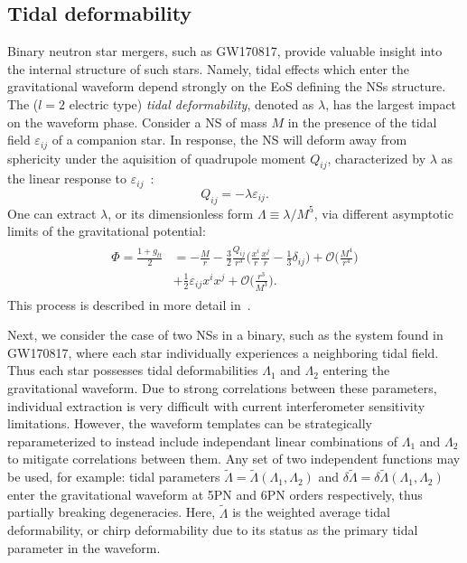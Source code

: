 \documentclass[prd,twocolumn,nofootinbib,superscriptaddress,amsmath,amssymb]{revtex4-1}
\begin{document}
\subsection{Tidal deformability}\label{tidal}
Binary neutron star mergers, such as GW170817, provide valuable insight into the internal structure of such stars. 
Namely, tidal effects which enter the gravitational waveform depend strongly on the EoS defining the NSs structure. 
The ($l=2$ electric type) \emph{tidal deformability}, denoted as $\lambda$, has the largest impact on the waveform phase. 
Consider a NS of mass $M$ in the presence of the tidal field $\varepsilon_{ij}$ of a companion star.
In response, the NS will deform away from sphericity under the aquisition of quadrupole moment $Q_{ij}$, characterized by $\lambda$ as the linear response to $\varepsilon_{ij}$~\cite{Flanagan2008,hinderer-love,Yagi2013}:
\begin{equation}
Q_{ij}=-\lambda \varepsilon_{ij}.
\end{equation}
One can extract $\lambda$, or its dimensionless form $\Lambda \equiv \lambda/M^5$, via different asymptotic limits of the gravitational potential:
\begin{align}
\begin{split}
\Phi=\frac{1+g_{tt}}{2}&=-\frac{M}{r} - \frac{3}{2}\frac{Q_{ij}}{r^3} \Bigg(\frac{x^i}{r} \frac{x^j}{r}-\frac{1}{3}\delta_{ij} \Bigg) + \mathcal{O} \Bigg( \frac{M^4}{r^4} \Bigg)\\
&+ \frac{1}{2} \varepsilon_{ij} x^i x^j + \mathcal{O} \Bigg( \frac{r^3}{M^3} \Bigg).
\end{split}
\end{align}
This process is described in more detail in~\cite{hinderer-love}.

Next, we consider the case of two NSs in a binary, such as the system found in GW170817, where each star 
individually experiences a neighboring tidal field.
Thus each star possesses tidal deformabilities $\Lambda_1$ and $\Lambda_2$ entering the gravitational waveform.
Due to strong correlations between these parameters, individual extraction is very difficult with current interferometer sensitivity limitations.
However, the waveform templates can be strategically reparameterized to instead include independant linear combinations of $\Lambda_1$ and $\Lambda_2$ to mitigate correlations between them. 
Any set of two independent functions may be used, for example: tidal parameters $\tilde{\Lambda}=\tilde{\Lambda}(\Lambda_1,\Lambda_2)$ and $\delta \tilde{\Lambda}=\delta \tilde{\Lambda}(\Lambda_1,\Lambda_2)$ enter the gravitational waveform at 5PN and 6PN orders respectively, thus partially breaking degeneracies.
Here, $\tilde{\Lambda}$ is the weighted average tidal deformability, or chirp deformability due to its status as the primary tidal parameter in the waveform. 
\end{document}
